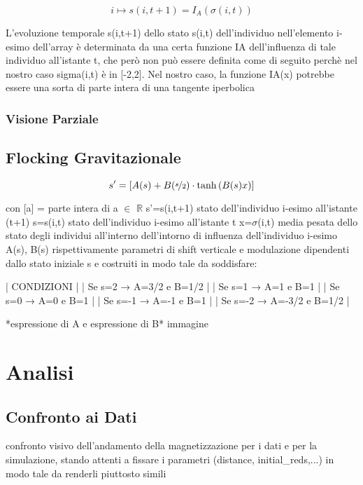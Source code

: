 \documentclass{article}
\begin{document}
\begin{equation}
    i \mapsto s(i,t+1) = I_A(\sigma(i,t))
    \label{Eq:2}
\end{equation}

L'evoluzione temporale s(i,t+1) dello stato s(i,t) dell'individuo nell'elemento i-esimo dell'array è determinata da una certa funzione IA dell'influenza di tale individuo all'istante t, che però non può essere definita come di seguito perchè nel nostro caso sigma(i,t) è in [-2,2].
Nel nostro caso, la funzione IA(x) potrebbe essere una sorta di parte intera di una tangente iperbolica

\subsubsection{Visione Parziale}
\label{Sec:2.1.1}
\subsection{Flocking Gravitazionale}
\label{Sec:2.2}

\begin{equation}
    s'=[A(s)+B(\nicefrac{s}{2}) \cdot \tanh{(B(s)x)}]
    \label{Eq:3}
\end{equation}


con [a] = parte intera di a {\footnotesize{$\in$}} $\mathbb{R}$
       s’=s(i,t+1) stato dell’individuo i-esimo all’istante (t+1)
       s=s(i,t) stato dell’individuo i-esimo all’istante t
       x=$\sigma$(i,t) media pesata dello stato degli individui all’interno dell’intorno di influenza  
                    dell’individuo i-esimo
       A(s), B(s) rispettivamente parametri di shift verticale e modulazione dipendenti dallo stato
                    iniziale s e costruiti in modo tale da soddisfare:

                    | CONDIZIONI                         |
                    | Se s=2  → A=3/2  e  B=1/2     |
                    | Se s=1  → A=1  e  B=1           |
                    | Se s=0  → A=0  e  B=1           |
                    | Se s=-1 → A=-1  e  B=1         |
                    | Se s=-2 → A=-3/2  e  B=1/2   |
                    
*espressione di A e espressione di B*
immagine


\section{Analisi}
\label{Sec:3}
\subsection{Confronto ai Dati}
\label{Sec:3.1}
confronto visivo dell'andamento della magnetizzazione per i dati e per la simulazione, stando attenti a fissare i parametri (distance, initial\_reds,...) in modo tale da renderli piuttosto simili
\end{document}
